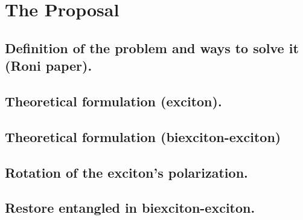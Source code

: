\section{The Proposal}
\subsection{Definition of the problem and ways to solve it (Roni paper).}
\subsection{Theoretical formulation (exciton).}
\subsection{Theoretical formulation (biexciton-exciton)}

\subsection{Rotation of the exciton's polarization.}
\subsection{Restore entangled in biexciton-exciton.}
